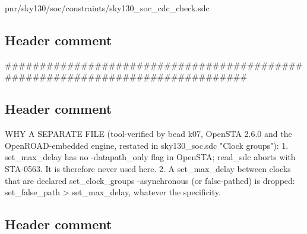 \begin{relocated}{pnr/sky130/soc/constraints/sky130_soc_cdc_check.sdc}

\subsection*{Header comment}

\begin{textblock}
##############################################################################
\end{textblock}

\subsection*{Header comment}

\begin{textblock}

WHY A SEPARATE FILE (tool-verified by bead k07, OpenSTA 2.6.0 and the OpenROAD-embedded
engine, restated in sky130_soc.sdc "Clock groups"):
  1. set_max_delay has no -datapath_only flag in OpenSTA; read_sdc aborts with STA-0563.
     It is therefore never used here.
  2. A set_max_delay between clocks that are declared set_clock_groups -asynchronous (or
     false-pathed) is dropped: set_false_path > set_max_delay, whatever the specificity.
\end{textblock}

\subsection*{Header comment}

\begin{textblock}


\end{textblock}
\end{relocated}
